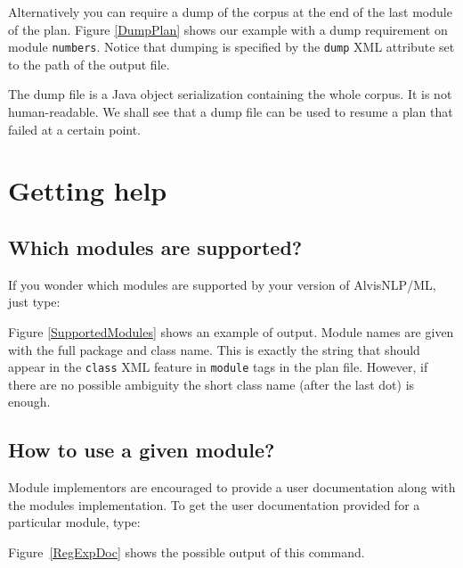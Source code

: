 \documentclass[a4paper]{book}
\begin{document}
Alternatively you can require a dump of the corpus at the end of the last module of the plan.
Figure \ref{DumpPlan} shows our example with a dump requirement on module \texttt{numbers}.
Notice that dumping is specified by the \texttt{dump} XML attribute set to the path of the output file.


The dump file is a Java object serialization containing the whole corpus.
It is not human-readable.
We shall see that a dump file can be used to resume a plan that failed at a certain point.

\section{Getting help}

\subsection{Which modules are supported?}

If you wonder which modules are supported by your version of AlvisNLP/ML, just type:

Figure \ref{SupportedModules} shows an example of output.
Module names are given with the full package and class name.
This is exactly the string that should appear in the \texttt{class} XML feature in \texttt{module} tags in the plan file.
However, if there are no possible ambiguity the short class name (after the last dot) is enough.


\subsection{How to use a given module?}

Module implementors are encouraged to provide a user documentation along with the modules implementation.
To get the user documentation provided for a particular module, type:


Figure~\ref{RegExpDoc} shows the possible output of this command.

\end{document}
